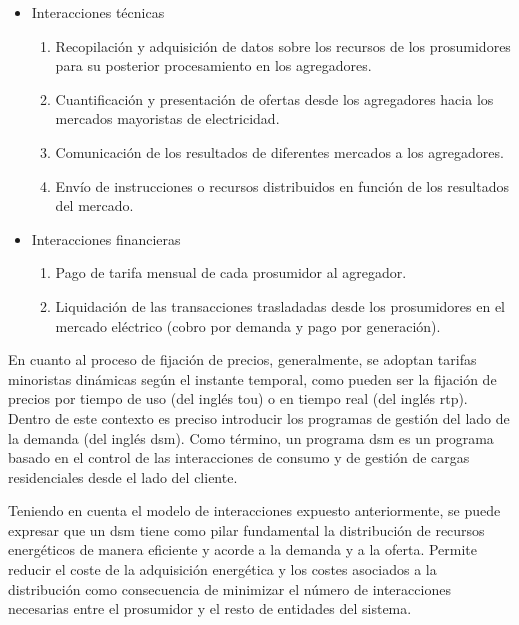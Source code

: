 \begin{itemize}
  \item Interacciones técnicas 
    \begin{enumerate}
      \item Recopilación y adquisición de datos sobre los recursos de los prosumidores para su posterior procesamiento en los agregadores.  
      \item Cuantificación y presentación de ofertas desde los agregadores hacia los mercados mayoristas de electricidad.
      \item Comunicación de los resultados de diferentes mercados a los agregadores.
      \item Envío de instrucciones o recursos distribuidos en función de los resultados del mercado.      
    \end{enumerate}

  \item Interacciones financieras
  \begin{enumerate}
    \item Pago de tarifa mensual de cada prosumidor al agregador.
    \item Liquidación de las transacciones trasladadas desde los prosumidores en el mercado eléctrico (cobro por demanda y pago por generación).    
  \end{enumerate}
\end{itemize}

\vspace{3mm}

En cuanto al proceso de fijación de precios, generalmente, se adoptan tarifas minoristas dinámicas según el instante temporal, como pueden ser la fijación de precios por tiempo de uso (del inglés \gls{tou}) o en tiempo real (del inglés \gls{rtp}). Dentro de este contexto es preciso introducir los programas de gestión del lado de la demanda (del inglés \gls{dsm}). Como término, un programa \gls{dsm} es un programa basado en el control de las interacciones de consumo y de gestión de cargas residenciales desde el lado del cliente. 

\vspace{3mm}

Teniendo en cuenta el modelo de interacciones expuesto anteriormente, se puede expresar que un \gls{dsm} tiene como pilar fundamental la distribución de recursos energéticos de manera eficiente y acorde a la demanda y a la oferta. Permite reducir el coste de la adquisición energética y los costes asociados a la distribución como consecuencia de minimizar el número de interacciones necesarias entre el prosumidor y el resto de entidades del sistema. \cite{dsm}

